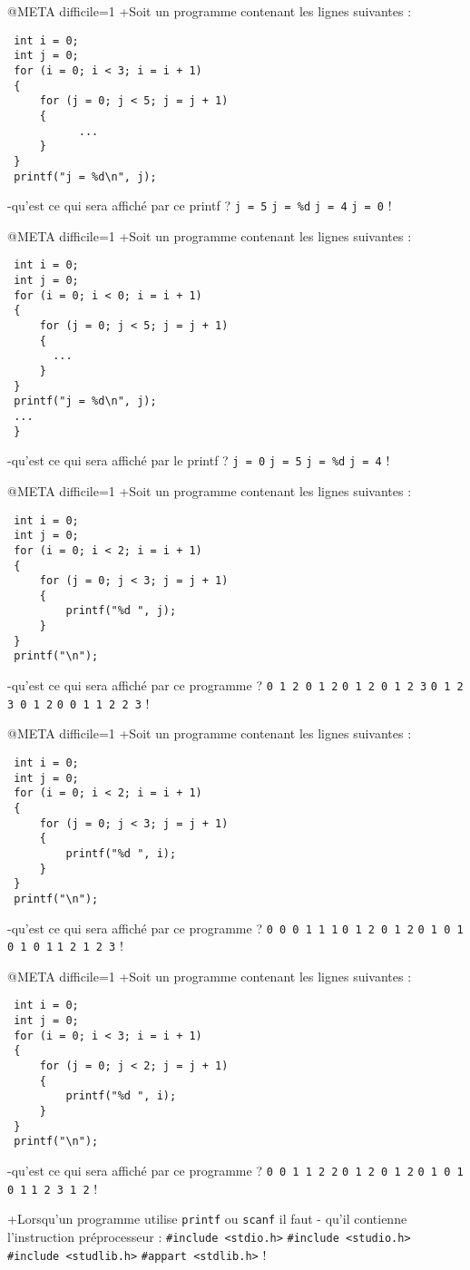 @META difficile=1
+Soit un programme contenant les lignes suivantes :
 \begin{verbatim}
 int i = 0;
 int j = 0;
 for (i = 0; i < 3; i = i + 1) 
 {
     for (j = 0; j < 5; j = j + 1) 
     {
           ...
     }
 }
 printf("j = %d\n", j); 
 \end{verbatim}
-qu'est ce qui sera affiché par ce printf ?
 \verb|j = 5|
 \verb|j = %d|
 \verb|j = 4|
 \verb|j = 0|
!

@META difficile=1
+Soit un programme contenant les lignes suivantes :
 \begin{verbatim}
 int i = 0;
 int j = 0;
 for (i = 0; i < 0; i = i + 1) 
 {
     for (j = 0; j < 5; j = j + 1) 
     {
       ...
     }
 }
 printf("j = %d\n", j);
 ...
 }
 \end{verbatim}
-qu'est ce qui sera affiché par le printf ?
 \verb|j = 0|
 \verb|j = 5|
 \verb|j = %d|
 \verb|j = 4|
!

@META difficile=1
+Soit un programme contenant les lignes suivantes :
 \begin{verbatim}
 int i = 0;
 int j = 0;
 for (i = 0; i < 2; i = i + 1) 
 {
     for (j = 0; j < 3; j = j + 1) 
     {
         printf("%d ", j);
     }
 }
 printf("\n");
\end{verbatim}
-qu'est ce qui sera affiché par ce programme ?
 \verb|0 1 2 0 1 2|
 \verb|0 1 2 0 1 2 3|
 \verb|0 1 2 3 0 1 2|
 \verb|0 0 1 1 2 2 3|
!

@META difficile=1
+Soit un programme contenant les lignes suivantes :
 \begin{verbatim}
 int i = 0;
 int j = 0;
 for (i = 0; i < 2; i = i + 1) 
 {
     for (j = 0; j < 3; j = j + 1) 
     {
         printf("%d ", i);
     }
 }
 printf("\n");
 \end{verbatim}
-qu'est ce qui sera affiché par ce programme ?
 \verb|0 0 0 1 1 1|
 \verb|0 1 2 0 1 2|
 \verb|0 1 0 1 0 1 0 1|
 \verb|1 2 1 2 3|
!

@META difficile=1
+Soit un programme contenant les lignes suivantes :
 \begin{verbatim}
 int i = 0;
 int j = 0;
 for (i = 0; i < 3; i = i + 1) 
 {
     for (j = 0; j < 2; j = j + 1) 
     {
         printf("%d ", i);
     }
 }
 printf("\n");
\end{verbatim}
-qu'est ce qui sera affiché par ce programme ?
 \verb|0 0 1 1 2 2|
 \verb|0 1 2 0 1 2|
 \verb|0 1 0 1 0 1|
 \verb|1 2 3 1 2|
!

+Lorsqu'un programme utilise \verb|printf| ou \verb|scanf| il faut
- qu'il contienne l'instruction préprocesseur :
 \verb|#include <stdio.h>|
 \verb|#include <studio.h>|
 \verb|#include <studlib.h>|
 \verb|#appart <stdlib.h>|
!

